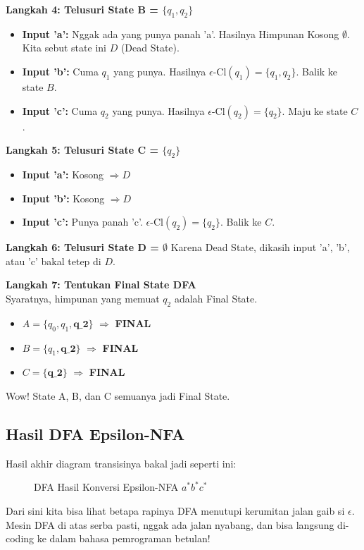 \documentclass[12pt,a4paper]{article}
\begin{document}
\textbf{Langkah 4: Telusuri State B = $\{q_1, q_2\}$}
\begin{itemize}
    \item \textbf{Input 'a':} Nggak ada yang punya panah 'a'. Hasilnya Himpunan Kosong $\emptyset$. Kita sebut state ini \textbf{$D$} (Dead State).
    \item \textbf{Input 'b':} Cuma $q_1$ yang punya. Hasilnya $\epsilon\text{-Cl}(q_1) = \{q_1, q_2\}$. Balik ke state \textbf{$B$}.
    \item \textbf{Input 'c':} Cuma $q_2$ yang punya. Hasilnya $\epsilon\text{-Cl}(q_2) = \{q_2\}$. Maju ke state \textbf{$C$}.
\end{itemize}

\textbf{Langkah 5: Telusuri State C = $\{q_2\}$}
\begin{itemize}
    \item \textbf{Input 'a':} Kosong $\Rightarrow D$
    \item \textbf{Input 'b':} Kosong $\Rightarrow D$
    \item \textbf{Input 'c':} Punya panah 'c'. $\epsilon\text{-Cl}(q_2) = \{q_2\}$. Balik ke \textbf{$C$}.
\end{itemize}

\textbf{Langkah 6: Telusuri State D = $\emptyset$}
Karena Dead State, dikasih input 'a', 'b', atau 'c' bakal tetep di \textbf{$D$}.

\textbf{Langkah 7: Tentukan Final State DFA} \\
Syaratnya, himpunan yang memuat $q_2$ adalah Final State.
\begin{itemize}
    \item $A = \{q_0, q_1, \textbf{q\_2}\}$ $\Rightarrow$ \textbf{FINAL}
    \item $B = \{q_1, \textbf{q\_2}\}$ $\Rightarrow$ \textbf{FINAL}
    \item $C = \{\textbf{q\_2}\}$ $\Rightarrow$ \textbf{FINAL}
\end{itemize}
Wow! State A, B, dan C semuanya jadi Final State.

\subsection{Hasil DFA Epsilon-NFA}
Hasil akhir diagram transisinya bakal jadi seperti ini:
\begin{figure}[h]
    \centering
    \caption{DFA Hasil Konversi Epsilon-NFA $a^*b^*c^*$}
\end{figure}

Dari sini kita bisa lihat betapa rapinya DFA menutupi kerumitan jalan gaib si $\epsilon$. Mesin DFA di atas serba pasti, nggak ada jalan nyabang, dan bisa langsung di-coding ke dalam bahasa pemrograman betulan!
\end{document}
